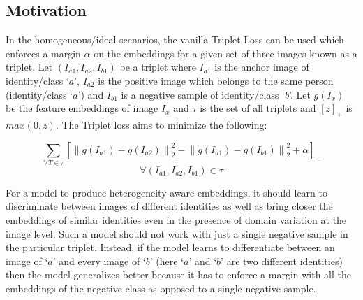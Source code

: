 \documentclass[10pt,twocolumn,letterpaper]{article}
\begin{document}
\subsection{Motivation}
In the homogeneous/ideal scenarios, the vanilla Triplet Loss \cite{schroff2015facenet} can be used which enforces a margin $\alpha$ on the embeddings for a given set of three images known as a triplet. Let $(I_{a1}, I_{a2}, I_{b1})$ be a triplet where $I_{a1}$ is the anchor image of identity/class `$a$', $I_{a2}$ is the positive image which belongs to the same person (identity/class `$a$') and $I_{b1}$ is a negative sample of identity/class `$b$'. Let $g(I_x)$ be the feature embeddings of image $I_x$ and $\tau$ is the set of all triplets and $[z]_+$ is $max(0,z)$. The Triplet loss \cite{schroff2015facenet} aims to minimize the following:

\begin{equation}
  \label{eqn:basic_triplet}
	\sum_{\forall T \in \tau} \left [\left \| g(I_{a1}) - g(I_{a2}) \right \|^2_2 - \left \| g(I_{a1}) - g(I_{b1}) \right \|^2_2   + \alpha \right]_+
\end{equation}
\begin{equation*}
  \forall (I_{a1}, I_{a2}, I_{b1}) \in \tau
\end{equation*}

For a model to produce heterogeneity aware embeddings, it should learn to discriminate between images of different identities as well as bring closer the embeddings of similar identities even in the presence of domain variation at the image level. Such a model should not work with just a single negative sample in the particular triplet. Instead, if the model learns to differentiate between an image of `$a$' and every image of `$b$' (here `$a$' and `$b$' are two different identities) then the model generalizes better because it has to enforce a margin with all the embeddings of the negative class as opposed to a single negative sample.
\end{document}
